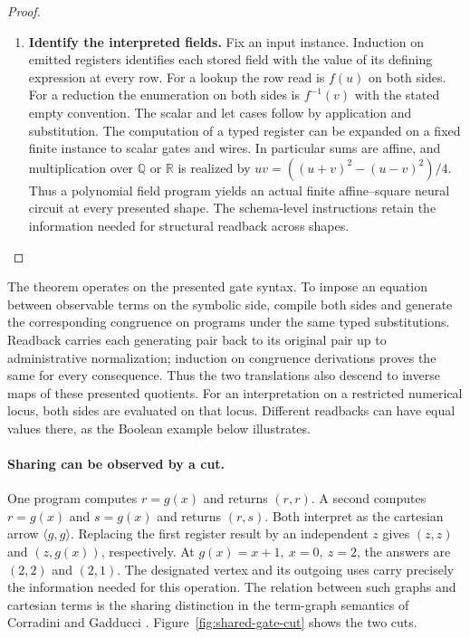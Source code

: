 \documentclass[11pt,a4paper]{article}
\theoremstyle{definition}
\theoremstyle{remark}\newaliascnt{remark}{theorem}
\newcommand{\Q}{\mathbb Q}
\newcommand{\R}{\mathbb R}
\numberwithin{equation}{section}
\begin{document}
\begin{proof}
\begin{enumerate}[titledsteps]
    \item \textbf{Identify the interpreted fields.} Fix an input instance. Induction on emitted registers identifies each stored field with the value of its defining expression at every row. For a lookup the row read is $f(u)$ on both sides. For a reduction the enumeration on both sides is $f^{-1}(v)$ with the stated empty convention. The scalar and let cases follow by application and substitution. The computation of a typed register can be expanded on a fixed finite instance to scalar gates and wires. In particular sums are affine, and multiplication over $\Q$ or $\R$ is realized by $uv=((u+v)^2-(u-v)^2)/4$. Thus a polynomial field program yields an actual finite affine--square neural circuit at every presented shape. The schema-level instructions retain the information needed for structural readback across shapes.\qedhere
\end{enumerate}
\end{proof}

The theorem operates on the presented gate syntax. To impose an equation between observable terms on the symbolic side, compile both sides and generate the corresponding congruence on programs under the same typed substitutions. Readback carries each generating pair back to its original pair up to administrative normalization; induction on congruence derivations proves the same for every consequence. Thus the two translations also descend to inverse maps of these presented quotients. For an interpretation on a restricted numerical locus, both sides are evaluated on that locus. Different readbacks can have equal values there, as the Boolean example below illustrates.
\paragraph{Sharing can be observed by a cut.}
One program computes \(r=g(x)\) and returns \((r,r)\). A second computes \(r=g(x)\) and \(s=g(x)\) and returns \((r,s)\). Both interpret as the cartesian arrow \(\langle g,g\rangle\). Replacing the first register result by an independent \(z\) gives \((z,z)\) and \((z,g(x))\), respectively. At \(g(x)=x+1,\ x=0,\ z=2\), the answers are \((2,2)\) and \((2,1)\). The designated vertex and its outgoing uses carry precisely the information needed for this operation. The relation between such graphs and cartesian terms is the sharing distinction in the term-graph semantics of Corradini and Gadducci \cite{corradini-gadducci}. Figure~\ref{fig:shared-gate-cut} shows the two cuts.
\end{document}
